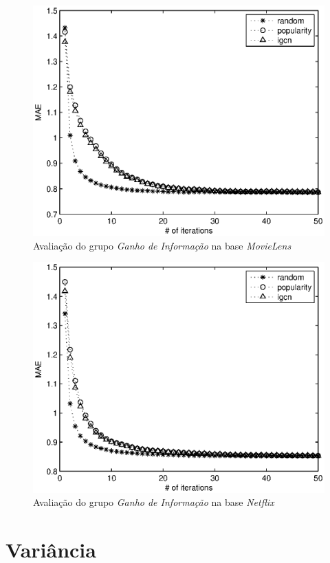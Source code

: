 \begin{figure}[ht]
\centering
\includegraphics{ml_igcn.eps}
\caption{Avaliação do grupo \textit{Ganho de Informação} na base \textit{MovieLens}}
\label{fig:igcn-movielens}
\end{figure}

\begin{figure}[ht]
\centering
\includegraphics{nf_igcn.eps}
\caption{Avaliação do grupo \textit{Ganho de Informação} na base \textit{Netflix}}
\label{fig:igcn-netflix}
\end{figure}

\section{Variância}

